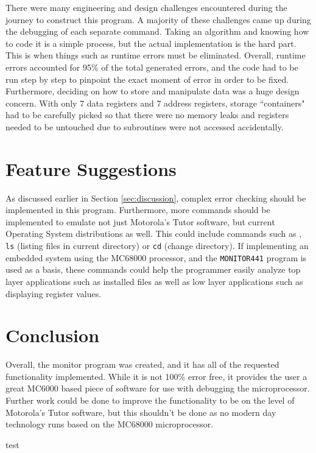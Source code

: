 \documentclass[12pt]{article}
\begin{document}
			There were many engineering and design challenges encountered during the journey to construct this program. A majority of these challenges came up during the debugging of each separate command. Taking an algorithm and knowing how to code it is a simple process, but the actual implementation is the hard part. This is when things such as runtime errors must be eliminated. Overall, runtime errors accounted for 95\% of the total generated errors, and the code had to be run step by step to pinpoint the exact moment of error in order to be fixed. Furthermore, deciding on how to store and manipulate data was a huge design concern. With only 7 data registers and 7 address registers, storage ``containers" had to be carefully picked so that there were no memory leaks and registers needed to be untouched due to subroutines were not accessed accidentally.
			\section{Feature Suggestions}
			As discussed earlier in Section \ref{sec:discussion}, complex error checking should be implemented in this program. Furthermore, more commands should be implemented to emulate not just Motorola's Tutor software, but current Operating System distributions as well. This could include commands such as , \texttt{ls} (listing files in current directory) or \texttt{cd} (change directory). If implementing an embedded system using the MC68000 processor, and the \texttt{MONITOR441} program is used as a basis, these commands could help the programmer easily analyze top layer applications such as installed files as well as low layer applications such as displaying register values.
			\section{Conclusion}
			Overall, the monitor program was created, and it has all of the requested functionality implemented. While it is not 100\% error free, it provides the user a great MC6000 based piece of software for use with debugging the microprocessor. Further work could be done to improve the functionality to be on the level of Motorola's Tutor software, but this shouldn't be done as no modern day technology runs based on the MC68000 microprocessor. 
			\begin{thebibliography}{1} 
				 test
			\end{thebibliography}
\end{document}
